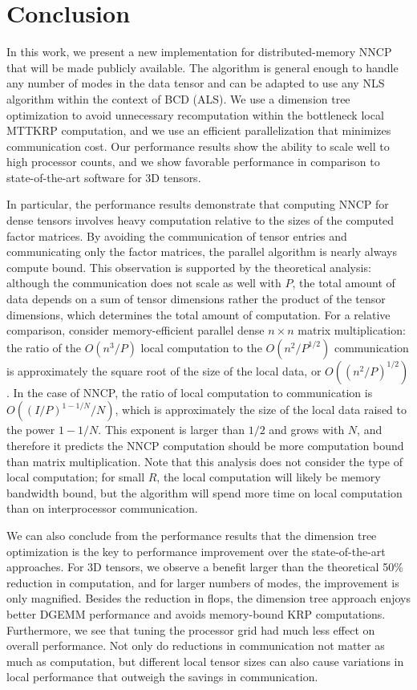 
\section{Conclusion} \label{sec:conclusion}

In this work, we present a new implementation for distributed-memory NNCP that will be made publicly available.
The algorithm is general enough to handle any number of modes in the data tensor and can be adapted to use any NLS algorithm within the context of BCD (ALS).
We use a dimension tree optimization to avoid unnecessary recomputation within the bottleneck local MTTKRP computation, and we use an efficient parallelization that minimizes communication cost.
Our performance results show the ability to scale well to high processor counts, and we show favorable performance in comparison to state-of-the-art software for 3D tensors.

In particular, the performance results demonstrate that computing NNCP for dense tensors involves heavy computation relative to the sizes of the computed factor matrices.
By avoiding the communication of tensor entries and communicating only the factor matrices, the parallel algorithm is nearly always compute bound.
This observation is supported by the theoretical analysis: although the communication does not scale as well with $P$, the total amount of data depends on a sum of tensor dimensions rather the product of the tensor dimensions, which determines the total amount of computation.
For a relative comparison, consider memory-efficient parallel dense $n\times n$ matrix multiplication: the ratio of the $O(n^3/P)$ local computation to the $O(n^2/P^{1/2})$ communication is approximately the square root of the size of the local data, or $O((n^2/P)^{1/2})$.
In the case of NNCP, the ratio of local computation to communication is $O((I/P)^{1-1/N}/N)$, which is approximately the size of the local data raised to the power $1-1/N$.
This exponent is larger than $1/2$ and grows with $N$, and therefore it predicts the NNCP computation should be more computation bound than matrix multiplication.
Note that this analysis does not consider the type of local computation; for small $R$, the local computation will likely be memory bandwidth bound, but the algorithm will spend more time on local computation than on interprocessor communication.

We can also conclude from the performance results that the dimension tree optimization is the key to performance improvement over the state-of-the-art approaches.
For 3D tensors, we observe a benefit larger than the theoretical 50\% reduction in computation, and for larger numbers of modes, the improvement is only magnified.
Besides the reduction in flops, the dimension tree approach enjoys better DGEMM performance and avoids memory-bound KRP computations.
Furthermore, we see that tuning the processor grid had much less effect on overall performance.
Not only do reductions in communication not matter as much as computation, but different local tensor sizes can also cause variations in local performance that outweigh the savings in communication. 

